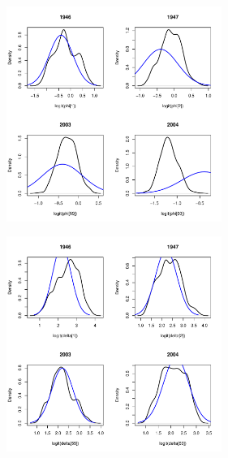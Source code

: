 \documentclass[mathserif,compress]{beamer}
\begin{document}

\begin{frame} 

\begin{center}
	\includegraphics[height=7cm]{figure/Post_phi} 
\end{center}
\end{frame}


\begin{frame} 

\begin{center}
	\includegraphics[height=7cm]{figure/Post_delta} 
\end{center}
\end{frame}

\end{document}
